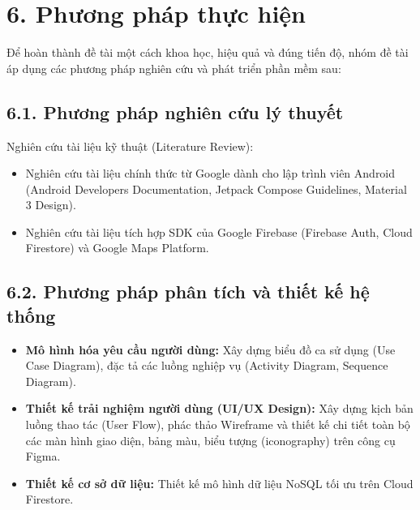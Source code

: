 \section*{6. Phương pháp thực hiện}

Để hoàn thành đề tài một cách khoa học, hiệu quả và đúng tiến độ, nhóm đề tài áp dụng các phương pháp nghiên cứu và phát triển phần mềm sau:

\subsection*{6.1. Phương pháp nghiên cứu lý thuyết}
Nghiên cứu tài liệu kỹ thuật (Literature Review):
\begin{itemize}
    \item Nghiên cứu tài liệu chính thức từ Google dành cho lập trình viên Android (Android Developers Documentation, Jetpack Compose Guidelines, Material 3 Design).
    \item Nghiên cứu tài liệu tích hợp SDK của Google Firebase (Firebase Auth, Cloud Firestore) và Google Maps Platform.
\end{itemize}

\subsection*{6.2. Phương pháp phân tích và thiết kế hệ thống}
\begin{itemize}
    \item \textbf{Mô hình hóa yêu cầu người dùng:} Xây dựng biểu đồ ca sử dụng (Use Case Diagram), đặc tả các luồng nghiệp vụ (Activity Diagram, Sequence Diagram).
    \item \textbf{Thiết kế trải nghiệm người dùng (UI/UX Design):} Xây dựng kịch bản luồng thao tác (User Flow), phác thảo Wireframe và thiết kế chi tiết toàn bộ các màn hình giao diện, bảng màu, biểu tượng (iconography) trên công cụ Figma.
    \item \textbf{Thiết kế cơ sở dữ liệu:} Thiết kế mô hình dữ liệu NoSQL tối ưu trên Cloud Firestore.
\end{itemize}

